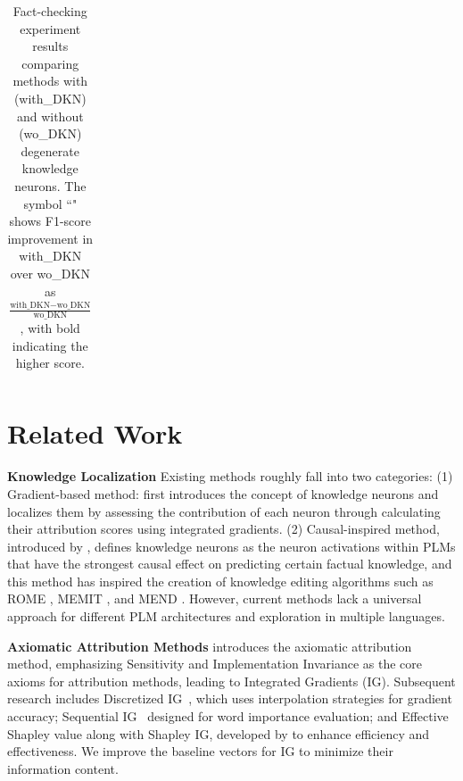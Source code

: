 \documentclass[]{article}
\newcommand{\vpara}[1]{\vspace{0.05in}\noindent\textbf{#1 }}
\begin{document}
\begin{table}
{\begin{tabular}{l|l|c|ccc}
\midrule
\end{tabular}
}
\caption{Fact-checking experiment results comparing methods with (with\_DKN) and without (wo\_DKN) degenerate knowledge neurons. The symbol ``\textuparrow" shows F1-score improvement in with\_DKN over wo\_DKN as $\frac{\text{with\_DKN} - \text{wo\_DKN}}{\text{wo\_DKN}}$, with bold indicating the higher score.}
\label{table:combined-experiments}
\end{table}


\section{Related Work}
\vpara{Knowledge Localization}
Existing methods roughly fall into two categories: (1) Gradient-based method: \citeauthor{dai2022kn} first introduces the concept of knowledge neurons and localizes them by assessing the contribution of each neuron \cite{key_value} through calculating their attribution scores using integrated gradients. (2) Causal-inspired method, introduced by \citeauthor{meng2022locating}, defines knowledge neurons as the neuron activations within PLMs that have the strongest causal effect on predicting certain factual knowledge, and this method has inspired the creation of knowledge editing algorithms such as ROME \cite{meng2022locating}, MEMIT \cite{meng2022memit}, and MEND \cite{mend}. However, current methods lack a universal approach for different PLM architectures and exploration in multiple languages.

\vpara{Axiomatic Attribution Methods}
\citeauthor{ig} introduces the axiomatic attribution method, emphasizing Sensitivity and Implementation Invariance as the core axioms for attribution methods, leading to Integrated Gradients (IG). Subsequent research includes Discretized IG~\cite{DIG}, which uses interpolation strategies for gradient accuracy; Sequential IG~\cite{enguehard2023sequential} designed for word importance evaluation; and Effective Shapley value along with Shapley IG, developed by \citeauthor{transparent} to enhance efficiency and effectiveness. We improve the baseline vectors for IG to minimize their information content.
\end{document}
